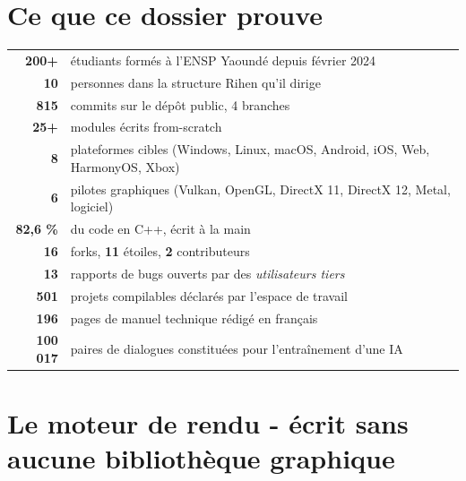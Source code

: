 \documentclass[11pt, a4paper, oneside]{article}
\begin{document}
\vspace{10pt}

\section*{Ce que ce dossier prouve}

\begin{center}
\begin{tabular}{@{}rl@{}}
\toprule
\textbf{200+} & étudiants formés à l'ENSP Yaoundé depuis février 2024 \\
\textbf{10} & personnes dans la structure Rihen qu'il dirige \\
\midrule
\textbf{815} & commits sur le dépôt public, 4 branches \\
\textbf{25+} & modules écrits from-scratch \\
\textbf{8} & plateformes cibles (Windows, Linux, macOS, Android, iOS, Web, HarmonyOS, Xbox) \\
\textbf{6} & pilotes graphiques (Vulkan, OpenGL, DirectX 11, DirectX 12, Metal, logiciel) \\
\textbf{82,6 \%} & du code en C++, écrit à la main \\
\textbf{16} & forks, \textbf{11} étoiles, \textbf{2} contributeurs \\
\textbf{13} & rapports de bugs ouverts par des \emph{utilisateurs tiers} \\
\textbf{501} & projets compilables déclarés par l'espace de travail \\
\textbf{196} & pages de manuel technique rédigé en français \\
\textbf{100 017} & paires de dialogues constituées pour l'entraînement d'une IA \\
\bottomrule
\end{tabular}
\end{center}

\vspace{6pt}

\newpage

\section{Le moteur de rendu - écrit sans aucune bibliothèque graphique}
\end{document}
